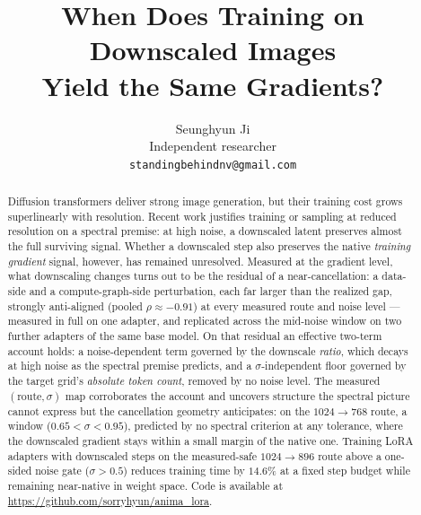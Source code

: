 \documentclass{article} %
\title{When Does Training on Downscaled Images\\
Yield the Same Gradients?}
\author{Seunghyun Ji\\
Independent researcher\\
\texttt{standingbehindnv@gmail.com}
}
\begin{document}
\maketitle
\fancyhead{}
\renewcommand{\headrulewidth}{0.4pt}

\begin{abstract}
Diffusion transformers deliver strong image generation, but their
training cost grows superlinearly with resolution. Recent work
justifies training or sampling at reduced resolution on a spectral
premise: at high noise, a downscaled latent preserves almost the full
surviving signal. Whether a downscaled step also preserves the native
\emph{training gradient} signal, however, has remained unresolved. Measured
at the gradient level, what downscaling changes turns out to be the
residual of a near-cancellation: a data-side and a compute-graph-side
perturbation, each far larger than the realized gap, strongly
anti-aligned (pooled $\rho \approx -0.91$) at every measured route
and noise level --- measured in full on one adapter, and replicated
across the mid-noise window on two further adapters of the same base
model. On that residual an effective two-term account holds:
a noise-dependent term governed by the downscale
\emph{ratio}, which decays at high noise as the spectral premise
predicts, and a $\sigma$-independent floor governed by the target
grid's \emph{absolute token count}, removed by no noise level. The
measured $(\text{route},\sigma)$ map corroborates the account and
uncovers structure the spectral picture cannot express but the
cancellation geometry anticipates: on the $1024{\to}768$
route, a window ($0.65<\sigma<0.95$), predicted by no spectral
criterion at any tolerance, where the downscaled gradient stays
within a small margin of the native one. Training LoRA adapters with
downscaled steps on the measured-safe $1024{\to}896$ route above a
one-sided noise gate ($\sigma > 0.5$) reduces training time by
$14.6\%$ at a fixed step budget while remaining near-native in weight
space. Code is available at
\url{https://github.com/sorryhyun/anima_lora}.
\end{abstract}






\clearpage

\end{document}
